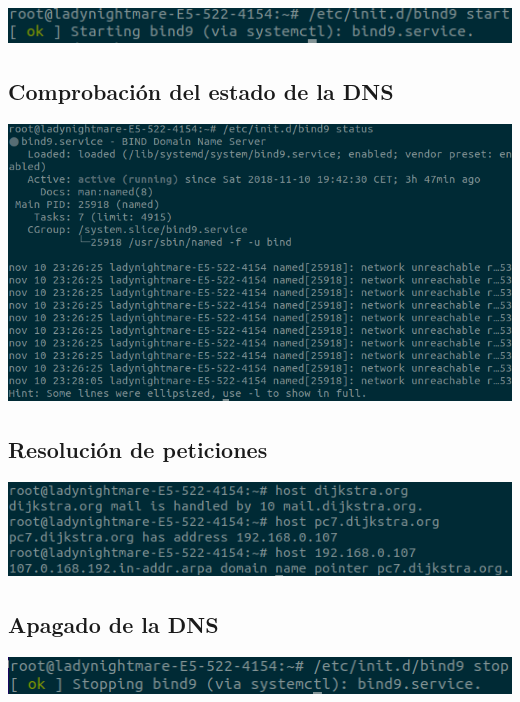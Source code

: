 \documentclass{article}
\begin{document}
\begin{center}
	\includegraphics[scale=0.5]{start.png} 
\end{center}

\subsection{Comprobación del estado de la DNS}

\begin{center}
	\includegraphics[scale=0.5]{status.png} 
\end{center}

\subsection{Resolución de peticiones}

\begin{center}
	\includegraphics[scale=0.5]{hosts.png} 
\end{center}

\subsection{Apagado de la DNS}

\begin{center}
	\includegraphics[scale=0.5]{stop.png} 
\end{center}
\end{document}
